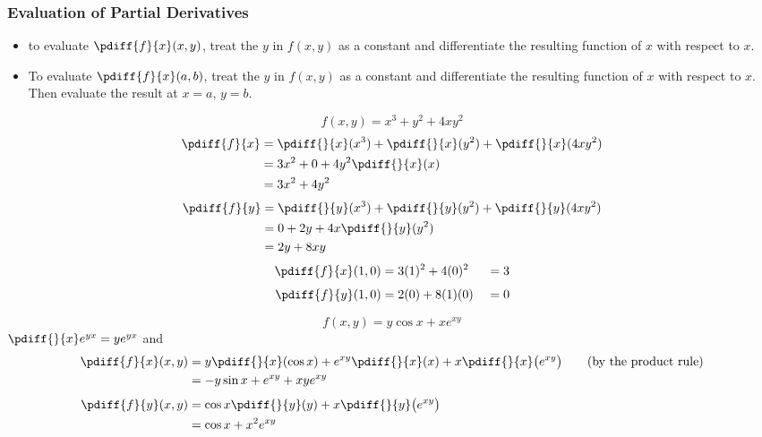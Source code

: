 \subsubsection{Evaluation of Partial Derivatives}\label{sec eval partials}
\begin{itemize}
\item
to evaluate $\pdiff{f}{x}(x,y)$, treat the $y$ in $f(x,y)$ as a constant
and differentiate the resulting function of $x$ with respect to $x$.
\item
To evaluate $\pdiff{f}{x}(a,b)$, treat the $y$ in $f(x,y)$ as a constant
and differentiate the resulting function of $x$ with respect to $x$.
Then evaluate the result at $x=a$, $y=b$.
\end{itemize}
\begin{eg}\label{eg partials A}
\begin{equation*}
f(x,y) = x^3+y^2+ 4xy^2
\end{equation*}
\begin{align*}
\pdiff{f}{x}%
&= \pdiff{}{x}(x^3) + \pdiff{}{x}(y^2) +\pdiff{}{x}(4xy^2) \\
&= 3x^2+0 + 4y^2\pdiff{}{x}(x) \\
&= 3x^2 +4y^2
\end{align*}
\begin{align*}
\pdiff{f}{y}%
&= \pdiff{}{y}(x^3) + \pdiff{}{y}(y^2) +\pdiff{}{y}(4xy^2) \\
&= 0 + 2y + 4x\pdiff{}{y}(y^2) \\
&= 2y+8xy
\end{align*}
\begin{alignat*}{3}
\pdiff{f}{x}(1,0) &= 3(1)^2 +4(0)^2&=3 \\[0.05in]
\pdiff{f}{y}(1,0) &= 2(0) +8(1)(0)\ &=0
\end{alignat*}
\end{eg}%
\begin{eg}\label{eg partials B}
\begin{equation*}
f(x,y) = y\cos x + xe^{xy}
\end{equation*}
$\pdiff{}{x} e^{yx}=y e^{yx}$ and
\begin{align*}
\pdiff{f}{x}(x,y) &= y\pdiff{}{x}(\cos x) + e^{xy}\pdiff{}{x}(x)
+x\pdiff{}{x}\big(e^{xy}\big)
\qquad\text{(by the product rule)} \\
&= -y\sin x + e^{xy} +xye^{xy} \\[0.05in]
\pdiff{f}{y}(x,y) &= \cos x\pdiff{}{y}(y) + x\pdiff{}{y}\big(e^{xy}\big) \\
&= \cos x + x^2e^{xy}
\end{align*}
\end{eg}

